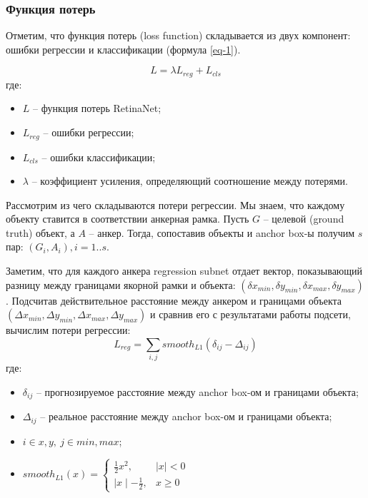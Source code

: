 \subsubsection{Функция потерь}

Отметим, что функция потерь (loss function) складывается из двух компонент: ошибки регрессии и классификации (формула \ref{eq-1}).

\begin{equation}\label{eq-1}
    L = \lambda L_{reg}+L_{cls}
\end{equation}
где:
\begin{itemize}
    \item $L$ -- функция потерь RetinaNet;
    \item $L_{reg}$ -- ошибки регрессии;
    \item $L_{cls}$ -- ошибки классификации;
    \item $\lambda$ -- коэффициент усиления, определяющий соотношение между потерями.
\end{itemize}

Рассмотрим из чего складываются потери регрессии. Мы знаем, что каждому объекту ставится в соответствии анкерная рамка. Пусть $G$ -- целевой (ground truth) объект, а $A$ -- анкер. Тогда, сопоставив объекты и anchor box-ы получим $s$ пар: $(G_i, A_i), i=1..s$.

Заметим, что для каждого анкера regression subnet отдает вектор, показывающий разницу между границами якорной рамки и объекта: $(\delta x_{min}, \delta y_{min}, \delta x_{max}, \delta y_{max})$.  Подсчитав действительное расстояние между анкером и границами объекта  $(\Delta x_{min}, \Delta y_{min}, \Delta x_{max}, \Delta y_{max})$ и сравнив его с результатами работы подсети, вычислим потери регрессии:
$$
L_{reg} = \sum_{i, j} smooth_{L1}(\delta_{ij}-\Delta_{ij})
$$
где:
\begin{itemize}
    \item $\delta_{ij}$ -- прогнозируемое расстояние между anchor box-ом и границами объекта;
    \item $\Delta_{ij}$ -- реальное расстояние между anchor box-ом и границами объекта;
    \item $i \in {x, y},\ j \in {min, max}$;
    \item $smooth_{L1}(x) = \begin{cases}\frac{1}{2}x^2, & \mid x\mid < 0\\\mid x\mid - \frac{1}{2}, & x \geq 0\end{cases}$
\end{itemize}

